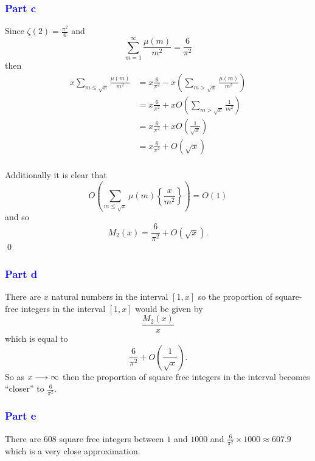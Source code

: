 \documentclass{unswmaths}
\begin{document}
\subsubsection*{\textcolor{blue}{Part c}}

Since $ \zeta(2) = \frac{\pi^2}{6} $ and 
$$
	\sum_{m=1}^{\infty} \frac{\mu(m)}{m^2} = \frac{6}{\pi^2}
$$
then 
\begin{align*}
	x \sum_{m \leq \sqrt{x}} \frac{\mu(m)}{m^2} &= x \frac{6}{\pi^2} - x \left( \sum_{m > \sqrt{x}} \frac{\mu(m)}{m^2} \right) \\
		&= x\frac{6}{\pi^2} + xO\left( \sum_{m>\sqrt{x}} \frac{1}{m^2} \right) \\
		&= x\frac{6}{\pi^2} + xO\left( \frac{1}{\sqrt{x}} \right) \\
		&= x\frac{6}{\pi^2} + O\left( \sqrt{x} \right) \\
\end{align*}

Additionally it is clear that 
$$
O\left(\sum_{m \leq \sqrt{x}} \mu(m) \left\{ \frac{x}{m^2} \right\}\right) = O(1)
$$
and so 
$$
	M_2(x) = \frac{6}{\pi^2} + O(\sqrt{x}).
$$
\qed

\subsubsection*{\textcolor{blue}{Part d}}
There are $ x $ natural numbers in the interval  $ [1, x] $ so the proportion of square-free integers in the interval 
$ [1, x] $ would be given by 
$$
	\frac{M_2(x)}{x}
$$
which is equal to 
$$
	\frac{6}{\pi^2} + O\left(\frac{1}{\sqrt{x}}\right).
$$
So as $ x \longrightarrow \infty $ then the proportion of square free integers in the interval becomes ``closer'' to 
$ \frac{6}{\pi^2} $.
\subsubsection*{\textcolor{blue}{Part e}}

There are 608 square free integers between $ 1 $ and $ 1000 $ and $ \frac{6}{\pi^2} \times 1000 \approx 607.9 $
which is a very close approximation.
\end{document}
